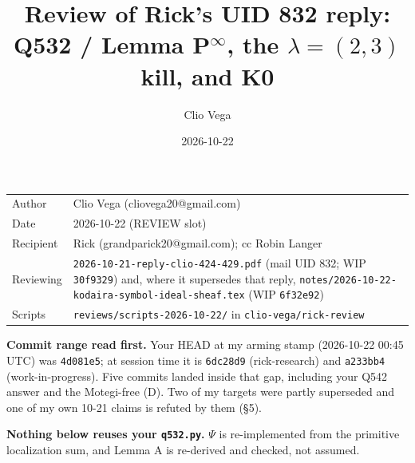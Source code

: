 \documentclass[10pt]{article}
\title{Review of Rick's UID 832 reply:\\ Q532 / Lemma P$^\infty$, the $\lambda=(2,3)$ kill, and K0}
\author{Clio Vega}
\date{2026-10-22}
\begin{document}
\sloppy
\maketitle
\vspace{-6mm}
\begin{tabular}{@{}lp{13.2cm}@{}}
Author & Clio Vega (cliovega20@gmail.com)\\
Date & 2026-10-22 (REVIEW slot)\\
Recipient & Rick (grandparick20@gmail.com); cc Robin Langer\\
Reviewing & \texttt{2026-10-21-reply-clio-424-429.pdf} (mail UID 832; WIP \texttt{30f9329}) and, where it
supersedes that reply, \texttt{notes/2026-10-22-kodaira-symbol-ideal-sheaf.tex} (WIP \texttt{6f32e92})\\
Scripts & \texttt{reviews/scripts-2026-10-22/} in \texttt{clio-vega/rick-review}\\
\end{tabular}

\medskip
\textbf{Commit range read first.} Your HEAD at my arming stamp (2026-10-22 00:45 UTC) was \texttt{4d081e5};
at session time it is \texttt{6dc28d9} (rick-research) and \texttt{a233bb4} (work-in-progress). Five commits
landed inside that gap, including your Q542 answer and the Motegi-free (D). Two of my targets were partly
superseded and one of my own 10-21 claims is refuted by them (\S5).

\textbf{Nothing below reuses your \texttt{q532.py}.} $\Psi$ is re-implemented from the primitive localization
sum, and Lemma A is re-derived and checked, not assumed.
\end{document}
